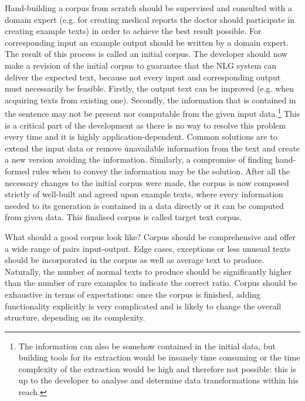 Hand-building a corpus from scratch should be supervised and consulted with a domain expert (e.g. for creating medical reports the doctor should participate in creating example texts) in order to achieve the best result possible. For corresponding input an example output should be written by a domain expert. The result of this process is called an initial corpus. The developer should now make a revision of the initial corpus to guarantee that the NLG system can deliver the expected text, because not every input and corresponding output must necessarily be feasible. Firstly, the output text can be improved (e.g. when acquiring texts from existing one). Secondly, the information that is contained in the sentence may not be present nor computable from the given input data.\footnote{The information can also be somehow contained in the initial data, but building tools for its extraction would be insanely time consuming or the time complexity of the extraction would be high and therefore not possible: this is up to the developer to analyse and determine data transformations within his reach.} This is a critical part of the development as there is no way to resolve this problem every time and it is highly application-dependent. Common solutions are to extend the input data or remove unavailable information from the text and create a new version avoiding the information. Similarly, a compromise of finding hand-formed rules when to convey the information may be the solution. After all the necessary changes to the initial corpus were made, the corpus is now composed strictly of well-built and agreed upon example texts, where every information needed to its generation is contained in a data directly or it can be computed from given data. This finalised corpus is called target text corpus.

What should a good corpus look like? Corpus should be comprehensive and offer a wide range of pairs input-output. Edge cases, exceptions or less unusual texts should be incorporated in the corpus as well as average text to produce. Naturally, the number of normal texts to produce should be significantly higher than the number of rare examples to indicate the correct ratio. Corpus should be exhaustive in terms of expectations: once the corpus is finished, adding functionality explicitly is very complicated and is likely to change the overall structure, depending on its complexity. 

